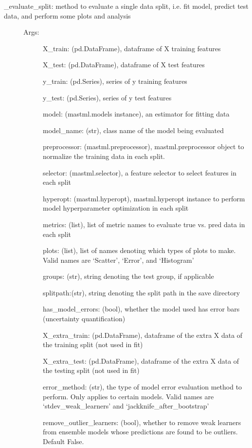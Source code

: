 \documentclass[letterpaper,10pt,english]{sphinxmanual}
\begin{document}
\begin{fulllineitems}
\begin{description}
\begin{description}
\item[{\_evaluate\_split: method to evaluate a single data split, i.e. fit model, predict test data, and perform some plots and analysis}] \leavevmode\begin{description}
\item[{Args:}] \leavevmode
X\_train: (pd.DataFrame), dataframe of X training features

X\_test: (pd.DataFrame), dataframe of X test features

y\_train: (pd.Series), series of y training features

y\_test: (pd.Series), series of y test features

model: (mastml.models instance), an estimator for fitting data

model\_name: (str), class name of the model being evaluated

preprocessor: (mastml.preprocessor), mastml.preprocessor object to normalize the training data in each split.

selector: (mastml.selector), a feature selector to select features in each split

hyperopt: (mastml.hyperopt), mastml.hyperopt instance to perform model hyperparameter optimization in each split

metrics: (list), list of metric names to evaluate true vs. pred data in each split

plots: (list), list of names denoting which types of plots to make. Valid names are ‘Scatter’, ‘Error’, and ‘Histogram’

groups: (str), string denoting the test group, if applicable

splitpath:(str), string denoting the split path in the save directory

has\_model\_errors: (bool), whether the model used has error bars (uncertainty quantification)

X\_extra\_train: (pd.DataFrame), dataframe of the extra X data of the training split (not used in fit)

X\_extra\_test: (pd.DataFrame), dataframe of the extra X data of the testing split (not used in fit)

error\_method: (str), the type of model error evaluation method to perform. Only applies to certain models. Valid names are ‘stdev\_weak\_learners’ and ‘jackknife\_after\_bootstrap’

remove\_outlier\_learners: (bool), whether to remove weak learners from ensemble models whose predictions are found to be outliers. Default False.


\end{description}
\end{description}
\end{description}
\end{fulllineitems}
\end{document}
